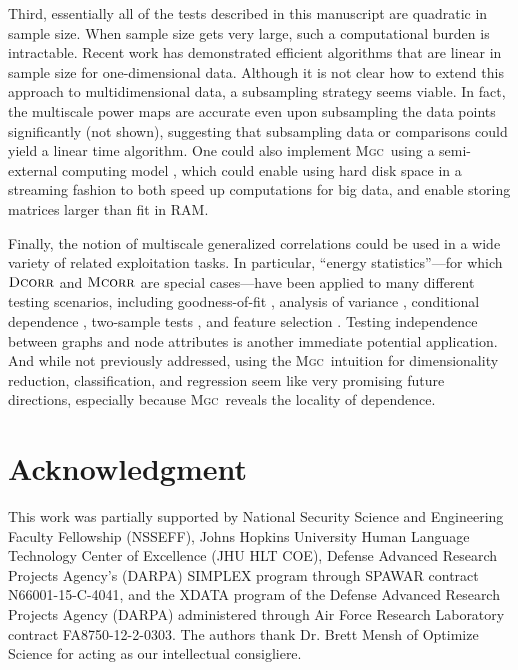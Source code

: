 \documentclass[11pt]{article}
\providecommand{\sct}[1]{{\normalfont\textsc{#1}}}
\newcommand{\Mgc}{\sct{Mgc}}
\newcommand{\Dcorr}{\sct{Dcorr}}
\newcommand{\Mcorr}{\sct{Mcorr}}
\begin{document}
Third, essentially all of the tests described in this manuscript are quadratic in sample size.  When sample size gets very large, such a computational burden is intractable.  Recent work has demonstrated efficient algorithms that are linear in sample size \cite{Huo2016} for one-dimensional data.  Although it is not clear how to extend this approach to multidimensional data, a subsampling strategy seems viable.  In fact, the multiscale power maps are accurate even upon subsampling the data points significantly (not shown), suggesting that subsampling data or comparisons  could yield a linear time algorithm.  One could also implement \Mgc~using a semi-external computing model \cite{Zheng2016},  which could enable using hard disk space in a streaming fashion to both speed up computations for big data, and enable storing matrices larger than fit in RAM.

Finally, the notion of multiscale generalized correlations could be used in a wide variety of related exploitation tasks.  In particular, ``energy statistics''---for which $\Dcorr$ and $\Mcorr$ are special cases---have been applied to many different testing scenarios, including goodness-of-fit  \cite{Szekely2005}, analysis of variance  \cite{Rizzo2010}, conditional dependence  \cite{Szekely2014,Wang2015},  two-sample tests \cite{Szekely2004}, and feature selection \cite{LiZhongZhu2012,Zhong2015}.   
Testing independence between graphs and node attributes \cite{Fosdick2015} is another immediate potential application.  And while not previously addressed, using the \Mgc~intuition for dimensionality reduction, classification, and regression seem like very promising future directions, especially because \Mgc~reveals the locality of dependence.








\section*{Acknowledgment}
This work was partially supported by
%
National Security Science and Engineering Faculty Fellowship (NSSEFF),
%
Johns Hopkins University Human Language Technology Center of Excellence (JHU HLT COE),
%
Defense Advanced Research Projects Agency's (DARPA) SIMPLEX program through SPAWAR contract N66001-15-C-4041,
%
and the XDATA program of the Defense Advanced Research Projects Agency (DARPA) administered through Air Force Research Laboratory contract FA8750-12-2-0303. The authors thank Dr. Brett Mensh of Optimize Science for acting as our intellectual consigliere.
\end{document}
